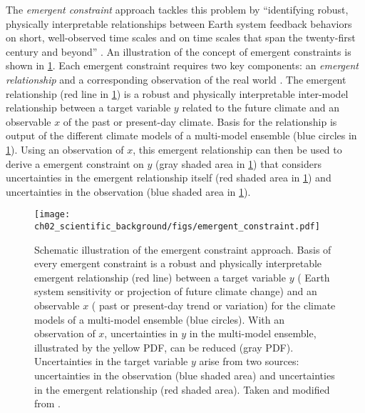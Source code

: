 The \emph{emergent constraint} approach tackles this problem by
\enquote{identifying robust, physically interpretable relationships between
  Earth system feedback behaviors on short, well-observed time scales and on
  time scales that span the twenty-first century and beyond}
\autocite{Eyring2019}. An illustration of the concept of emergent constraints
is shown in \cref{fig:02:emergent_constraint}. Each emergent constraint
requires two key components: an \emph{emergent relationship} and a
corresponding observation of the real world \autocite{Eyring2019}. The emergent
relationship (red line in \cref{fig:02:emergent_constraint}) is a robust and
physically interpretable inter-model relationship between a target variable $y$
related to the future climate and an observable $x$ of the past or present-day
climate. Basis for the relationship is output of the different climate models
of a multi-model ensemble (blue circles in \cref{fig:02:emergent_constraint}).
Using an observation of $x$, this emergent relationship can then be used to
derive a emergent constraint on $y$ (gray shaded area in
\cref{fig:02:emergent_constraint}) that considers uncertainties in the emergent
relationship itself (red shaded area in \cref{fig:02:emergent_constraint}) and
uncertainties in the observation (blue shaded area in
\cref{fig:02:emergent_constraint}).

\begin{figure}[t]
  \centering
  \texttt{[image: 
    ch02\_scientific\_background/figs/emergent\_constraint.pdf]}
  \caption{Schematic illustration of the emergent constraint approach. Basis of
    every emergent constraint is a robust and physically interpretable emergent
    relationship (red line) between a target variable $y$ (\eg{} Earth system
    sensitivity or projection of future climate change) and an observable $x$
    (\eg{} past or present-day trend or variation) for the climate models of a
    multi-model ensemble (blue circles). With an observation of $x$,
    uncertainties in $y$ in the multi-model ensemble, illustrated by the yellow
    \acf{PDF}, can be reduced (gray \acs{PDF}). Uncertainties in the target
    variable $y$ arise from two sources: uncertainties in the observation (blue
    shaded area) and uncertainties in the emergent relationship (red shaded
    area). Taken and modified from \textcite{Eyring2019}.}
  \label{fig:02:emergent_constraint}
\end{figure}

